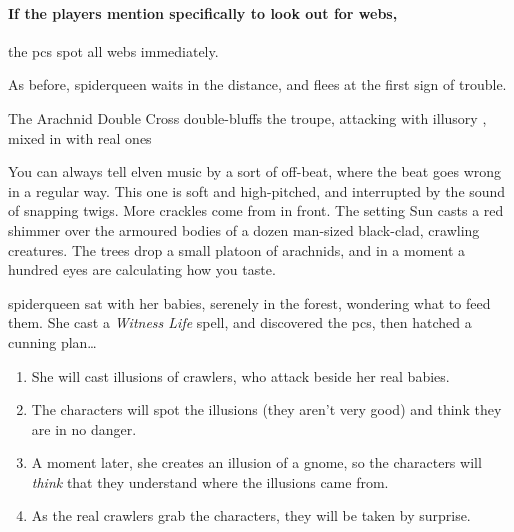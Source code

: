 \paragraph{If the players mention specifically to look out for webs,}
the \glspl{pc} spot all webs immediately.

As before, \gls{spiderqueen} waits in the distance, and flees at the first sign of trouble.



{The Arachnid Double Cross}%
{ double-bluffs the troupe, attacking with illusory , mixed in with real ones}%
\label{spiderqueenssong}

\begin{boxtext}
  You can always tell elven music by a sort of off-beat, where the beat goes wrong in a regular way.
  This one is soft and high-pitched, and interrupted by the sound of snapping twigs.
  More crackles come from in front.
  The setting Sun casts a red shimmer over the armoured bodies of a dozen man-sized black-clad, crawling creatures.
  The trees drop a small platoon of arachnids, and in a moment a hundred eyes are calculating how you taste.
\end{boxtext}

\Gls{spiderqueen} sat with her babies, serenely in the forest, wondering what to feed them.
She cast a \textit{Witness Life} spell, and discovered the \glspl{pc}, then hatched a cunning plan\ldots

\bigbreak

\begin{enumerate}
  \item
  She will cast illusions of \glspl{crawler}, who attack beside her real babies.
  \item
  The characters will spot the illusions (they aren't very good) and think they are in no danger.
  \item
  A moment later, she creates an illusion of a gnome, so the characters will \emph{think} that they understand where the illusions came from.
  \item
  As the real \glspl{crawler} grab the characters, they will be taken by surprise.
\end{enumerate}

